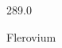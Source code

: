 \documentclass[12pt]{article}
\begin{document}
\hfill{}
\vfill
\begin{center}
  {\fontsize{50}{60}
  }

  289.0

Flerovium
\end{center}
\vfill
\end{document}
